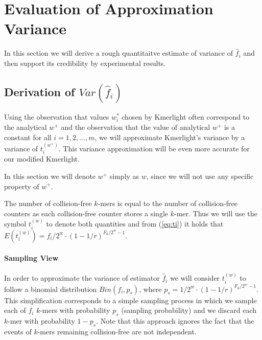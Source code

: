 \section{Evaluation of Approximation Variance}
\label{sec:estimation-variance}

In this section we will derive a rough quantitaitve estimate of variance of $ \hat f_i$
and then support its credibility by experimental results.

\subsection{Derivation of $Var(\hat f_i)$}
Using the observation that values $w_i^*$ chosen by Kmerlight often correspond
to the analytical $w^+$ and the observation that the value of analytical $w^+$ is a constant
for all $i=1, 2, \dots, m$, we will approximate Kmerlight's variance by a variance
of $t_i^{(w^+)}$. This variance approximation will be even more accurate for our modified
Kmerlight. 

In this section we will denote
$w^+$ simply as $w$, since we will not use any specific property of $w^+$.

The number of collision-free $k$-mers is equal to the number of collision-free counters
as each collision-free counter stores a single $k$-mer. Thus we will use the symbol
$t_i^{(w)}$ to denote both quantities and  from (\ref{eq:ti}) it holds that 
$E(t_i^{(w)}) = f_i/2^w \cdot (1 - 1/r)^{F_0/2^w-1}$.

% 

\paragraph{Sampling View}
In order to approximate the variance of estimator $\hat f_i$ we will consider
$t_i^{(w)}$ to follow a binomial distribution $Bin(f_i, p_s)$, where
$p_s = 1/2^w \cdot (1 - 1/r)^{F_0/2^w-1}$.
This simplification corresponds to a simple sampling process in which we sample each of $f_i$ 
$k$-mers with probability $p_s$ (sampling probability) and we discard each $k$-mer
with probability $1 - p_s$. Note that this approach ignores the fact that the events
of $k$-mers remaining collision-free are not independent. 

